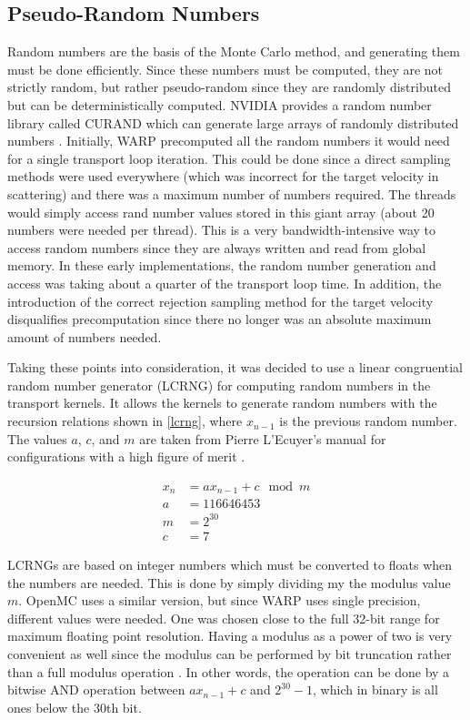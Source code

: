 \subsection{Pseudo-Random Numbers}

Random numbers are the basis of the Monte Carlo method, and generating them must be done efficiently.  Since these numbers must be computed, they are not strictly random, but rather pseudo-random since they are randomly distributed but can be deterministically computed.  NVIDIA provides a random number library called CURAND which can generate large arrays of randomly distributed numbers \cite{curand}.  Initially, WARP precomputed all the random numbers it would need for a single transport loop iteration.  This could be done since a direct sampling methods were used everywhere (which was incorrect for the target velocity in scattering) and there was a maximum number of numbers required.  The threads would simply access rand number values stored in this giant array (about 20 numbers were needed per thread).  This is a very bandwidth-intensive way to access random numbers since they are always written and read from global memory.  In these early implementations, the random number generation and access was taking about a quarter of the transport loop time.  In addition, the introduction of the correct rejection sampling method for the target velocity disqualifies precomputation since there no longer was an absolute maximum amount of numbers needed.

Taking these points into consideration, it was decided to use a linear congruential random number generator (LCRNG) for computing random numbers in the transport kernels.  It allows the kernels to generate random numbers with the recursion relations shown in \eqref{lcrng}, where $x_{n-1}$ is the previous random number.  The values $a$, $c$, and $m$ are taken from Pierre L'Ecuyer's manual for configurations with a high figure of merit \cite{lcrng}.   

\begin{equation}
\begin{split}
x_{n} &= a x_{n-1} + c \mod m  \\
a &= 116646453 \\
m &=  2^{30} \\
c &= 7
\end{split}
\label{lcrng}
\end{equation}

LCRNGs are based on integer numbers which must be converted to floats when the numbers are needed.  This is done by simply dividing my the modulus value $m$.  OpenMC uses a similar version, but since WARP uses single precision, different values were needed.   One was chosen close to the full 32-bit range for maximum floating point resolution.  Having a modulus as a power of two is very convenient as well since the modulus can be performed by bit truncation rather than a full modulus operation \cite{openmc}.  In other words, the operation can be done by a bitwise AND operation between $a x_{n-1} + c$ and $2^{30}-1$, which in binary is all ones below the 30th bit.

